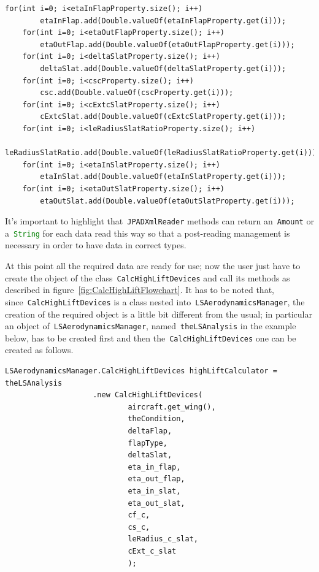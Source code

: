 \begin{lstlisting}[caption={Excerpt of B747-100B test - Input data reading}, captionpos=b, tabsize=2]
	for(int i=0; i<etaInFlapProperty.size(); i++)
		etaInFlap.add(Double.valueOf(etaInFlapProperty.get(i)));
	for(int i=0; i<etaOutFlapProperty.size(); i++)
		etaOutFlap.add(Double.valueOf(etaOutFlapProperty.get(i)));
	for(int i=0; i<deltaSlatProperty.size(); i++)
		deltaSlat.add(Double.valueOf(deltaSlatProperty.get(i)));
	for(int i=0; i<cscProperty.size(); i++)
		csc.add(Double.valueOf(cscProperty.get(i)));
	for(int i=0; i<cExtcSlatProperty.size(); i++)
		cExtcSlat.add(Double.valueOf(cExtcSlatProperty.get(i)));
	for(int i=0; i<leRadiusSlatRatioProperty.size(); i++)
		leRadiusSlatRatio.add(Double.valueOf(leRadiusSlatRatioProperty.get(i)));
	for(int i=0; i<etaInSlatProperty.size(); i++)
		etaInSlat.add(Double.valueOf(etaInSlatProperty.get(i)));
	for(int i=0; i<etaOutSlatProperty.size(); i++)
		etaOutSlat.add(Double.valueOf(etaOutSlatProperty.get(i)));
\end{lstlisting}

\bigskip
\noindent
It's important to highlight that~\lstinline[language=Java]!JPADXmlReader! methods can return an~\lstinline[language=Java]!Amount!\cite{jscienceAmount} or a~\lstinline[language=Java]!String! for each data read this way so that a post-reading management is necessary in order to have data in correct types.

\bigskip
\noindent
At this point all the required data are ready for use; now the user just have to create the object of the class~\lstinline[language=Java]!CalcHighLiftDevices! and call its methods as described in figure~\ref{fig:CalcHighLiftFlowchart}.
%
It has to be noted that, since~\lstinline[language=Java]!CalcHighLiftDevices! is a class nested into~\lstinline[language=Java]!LSAerodynamicsManager!, the creation of the required object is a little bit different from the usual; in particular an object of~\lstinline[language=Java]!LSAerodynamicsManager!, named~\lstinline[language=Java]!theLSAnalysis! in the example below, has to be created first and then the~\lstinline[language=Java]!CalcHighLiftDevices! one can be created as follows.

\bigskip
\lstset{language=Java}
\begin{lstlisting}[caption={Excerpt of B747-100B test - calculator object creation}, captionpos=b, tabsize=2]
	LSAerodynamicsManager.CalcHighLiftDevices highLiftCalculator = theLSAnalysis
					.new CalcHighLiftDevices(
							aircraft.get_wing(),
							theCondition,
							deltaFlap,
							flapType,
							deltaSlat,
							eta_in_flap,
							eta_out_flap,
							eta_in_slat,
							eta_out_slat,
							cf_c,
							cs_c,
							leRadius_c_slat,
							cExt_c_slat
							);
\end{lstlisting}

